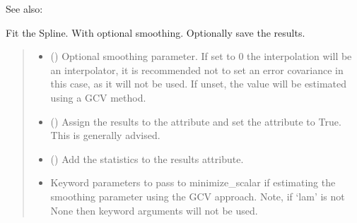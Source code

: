 \documentclass[letterpaper,10pt,english]{sphinxmanual}
\begin{document}
\begin{fulllineitems}
\begin{fulllineitems}
\begin{sphinxseealso}{See also:}
\begin{description}
\end{description}


\end{sphinxseealso}


\end{fulllineitems}


\begin{fulllineitems}
\label{\detokenize{splines:glomar_gridding.spline.Spline.fit}}
\pysigstartsignatures
\pysiglinewithargsret
{}
{\sphinxparamcomma {}\sphinxparamcomma {}\sphinxparamcomma {}}
{}
\pysigstopsignatures
\sphinxAtStartPar
Fit the Spline. With optional smoothing. Optionally save the results.
\begin{quote}\begin{description}
\begin{itemize}
\item {}
\sphinxAtStartPar
{} () \textendash{} Optional smoothing parameter. If set to 0 the interpolation will be
an  interpolator, it is recommended not to set an error
covariance in this case, as it will not be used. If unset, the
value will be estimated using a GCV method.

\item {}
\sphinxAtStartPar
{} () \textendash{} Assign the results to the  attribute and set the 
attribute to True. This is generally advised.

\item {}
\sphinxAtStartPar
{} () \textendash{} Add the statistics to the results attribute.

\item {}
\sphinxAtStartPar
{} \textendash{} Keyword parameters to pass to minimize\_scalar if estimating the
smoothing parameter using the GCV approach. Note, if ‘lam’ is not
None then keyword arguments will not be used.


\end{itemize}
\end{description}
\end{quote}
\end{fulllineitems}
\end{fulllineitems}
\end{document}
